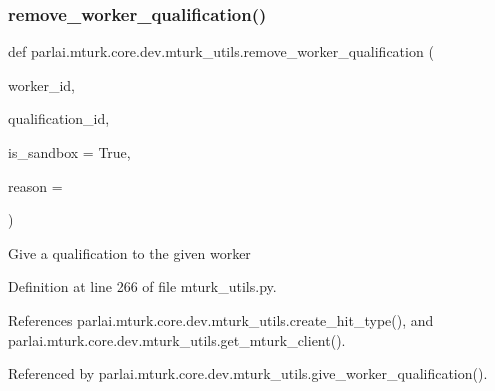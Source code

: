 \subsubsection{\texorpdfstring{remove\+\_\+worker\+\_\+qualification()}{remove\_worker\_qualification()}}
{\footnotesize\ttfamily def parlai.\+mturk.\+core.\+dev.\+mturk\+\_\+utils.\+remove\+\_\+worker\+\_\+qualification (\begin{DoxyParamCaption}\item[{}]{worker\+\_\+id,  }\item[{}]{qualification\+\_\+id,  }\item[{}]{is\+\_\+sandbox = {\ttfamily True},  }\item[{}]{reason = {\ttfamily \textquotesingle{}\textquotesingle{}} }\end{DoxyParamCaption})}

\begin{DoxyVerb}Give a qualification to the given worker\end{DoxyVerb}
 

Definition at line 266 of file mturk\+\_\+utils.\+py.



References parlai.\+mturk.\+core.\+dev.\+mturk\+\_\+utils.\+create\+\_\+hit\+\_\+type(), and parlai.\+mturk.\+core.\+dev.\+mturk\+\_\+utils.\+get\+\_\+mturk\+\_\+client().



Referenced by parlai.\+mturk.\+core.\+dev.\+mturk\+\_\+utils.\+give\+\_\+worker\+\_\+qualification().

